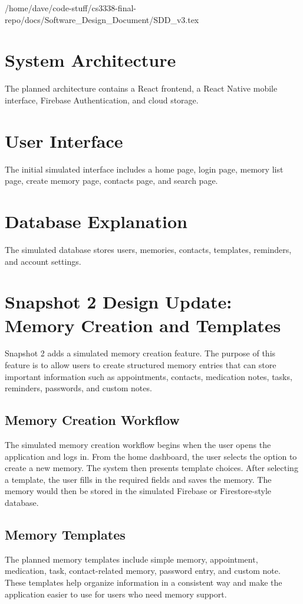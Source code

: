 /home/dave/code-stuff/cs3338-final-repo/docs/Software_Design_Document/SDD_v3.tex\documentclass{article}
\begin{document}
\section{System Architecture}
The planned architecture contains a React frontend, a React Native mobile interface, Firebase Authentication, and cloud storage.

\section{User Interface}
The initial simulated interface includes a home page, login page, memory list page, create memory page, contacts page, and search page.

\section{Database Explanation}
The simulated database stores users, memories, contacts, templates, reminders, and account settings.

\section{Snapshot 2 Design Update: Memory Creation and Templates}

Snapshot 2 adds a simulated memory creation feature. The purpose of this feature is to allow users to create structured memory entries that can store important information such as appointments, contacts, medication notes, tasks, reminders, passwords, and custom notes.

\subsection{Memory Creation Workflow}

The simulated memory creation workflow begins when the user opens the application and logs in. From the home dashboard, the user selects the option to create a new memory. The system then presents template choices. After selecting a template, the user fills in the required fields and saves the memory. The memory would then be stored in the simulated Firebase or Firestore-style database.

\subsection{Memory Templates}

The planned memory templates include simple memory, appointment, medication, task, contact-related memory, password entry, and custom note. These templates help organize information in a consistent way and make the application easier to use for users who need memory support.
\end{document}
